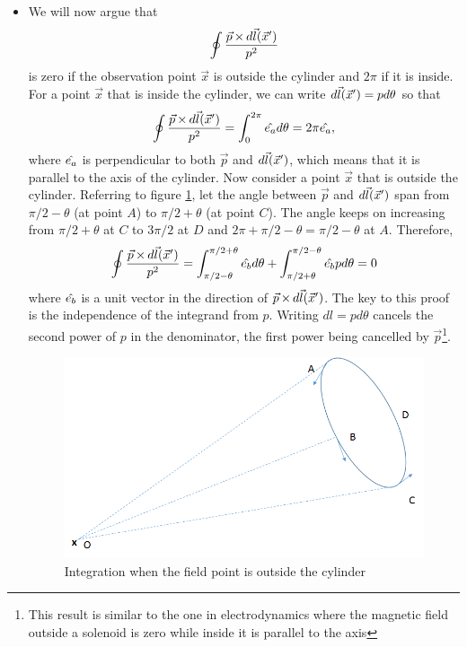 \begin{itemize}
\item We will now argue that
\[
\oint\frac{\vec{p} \operatorname{\times} d\vec{l}(\vec{x}^\prime)}{p^2}
\]
is zero if the observation point $\vec{x}$ is outside the cylinder and $2\pi$ if it is inside. For a point $\vec{x}$ that is inside the cylinder, we can write $d\vec{l}(\vec{x}^\prime) = 
pd\theta$ so that
\[
\oint\frac{\vec{p} \operatorname{\times} d\vec{l}(\vec{x}^\prime)}{p^2} = \int_0^{2\pi} \hat{e_{a}} d\theta = 2\pi\hat{e_{a}},
\]
where $\hat{e_{a}}$ is perpendicular to both $\vec{p}$ and $d\vec{l}(\vec{x}^\prime)$, which means that it is parallel to the axis of the cylinder. Now consider a point $\vec{x}$ that is
outside the cylinder. Referring to figure \ref{c2f7}, let the angle between $\vec{p}$ and $d\vec{l}(\vec{x}^\prime)$ span from $\pi/2 - \theta$ (at point $A$) to $\pi/2 + \theta$ (at point 
$C$). The angle keeps on increasing from $\pi/2 + \theta$ at $C$ to $3\pi/2$ at $D$ and $2\pi + \pi/2 - \theta = \pi/2 - \theta$ at $A$. Therefore,
\[
\oint\frac{\vec{p} \operatorname{\times} d\vec{l}(\vec{x}^\prime)}{p^2} = \int_{\pi/2 - \theta}^{\pi/2 + \theta}\hat{e_{b}}d\theta + \int_{\pi/2 + \theta}^{\pi/2 - \theta}\hat{e_{b}}{p}d\theta = 0
\]
where $\hat{e_{b}}$ is a unit vector in the direction of $\vec{p} \operatorname{\times} d\vec{l}(\vec{x}^\prime)$. The key to this proof is the independence of the integrand from $p$. Writing $dl = pd\theta$
cancels the second power of $p$ in the denominator, the first power being cancelled by $\vec{p}$\footnote{This result is similar to the one in electrodynamics where the magnetic field 
outside a solenoid is zero while inside it is parallel to the axis}.
\begin{figure}[!ht]
\centering
\centerline{\includegraphics[scale=.35]{c2f7}}
\caption{Integration when the field point is outside the cylinder}
\label{c2f7}
\end{figure}


\end{itemize}
